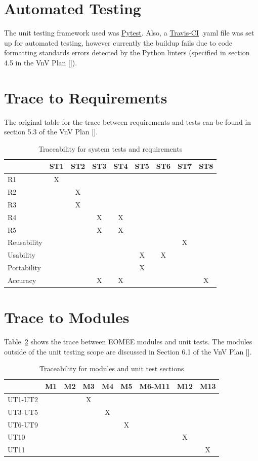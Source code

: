 \documentclass[12pt, titlepage]{article}
\begin{document}
\section{Automated Testing}
The unit testing framework used was \href{https://docs.pytest.org/en/stable/} 
{Pytest}. Also, a \href{https://travis-ci.org/}{Travis-CI} .yaml file was set 
up for automated 
testing, however currently the buildup fails due to code formatting standards 
errors detected by the Python linters (specified in section 4.5 in the VnV 
Plan [\cite{VnV2020}]).

		
\section{Trace to Requirements}
The original table for the trace between requirements and tests can be found in 
section 5.3 of the VnV Plan [\cite{VnV2020}].
\begin{table}[ht]
	\centering
	\begin{tabular}{|l|c|c|c|c|c|c|c|c|}
		\hline
		& ST1& ST2& ST3& ST4& ST5& 
		ST6& ST7& ST8\\	\hline	
		R1& X& & & & & & &\\ \hline
		R2&  & X& & & & & &\\ \hline
		R3&  & X& & & & & &\\ \hline
		R4&  &  & X& X& & & & \\ \hline
		R5&  &  & X& X& & & &\\ \hline
		Reusability& & & & & & &  X& \\ \hline
		Usability& & & & &   X& X& &\\ \hline
		Portability& & & &   & X& && \\ \hline
		Accuracy& & & X& X&  &  & & X\\ \hline
	\end{tabular}
	\caption{Traceability for system tests and requirements}
	\label{table:traceab}
\end{table}
		
\section{Trace to Modules}	

Table~\ref{table:moduletraceab} shows the trace between EOMEE modules and 
unit tests. The modules outside of the unit testing scope are discussed in 
Section 6.1 of the VnV Plan [\cite{VnV2020}].

\begin{table}[ht]
	\centering
	\begin{tabular}{l|c|c|c|c|c|c|c|c}
		\hline
		&M1& M2& M3& M4& M5& M6-M11& M12& M13\\	\hline	
		UT1-UT2&  & & X& & & &&\\ \hline
		UT3-UT5&  & & &X & & &&\\ \hline
		UT6-UT9&  & & & &X & &&\\ \hline
		UT10&  & & & & & &X&\\ \hline
		UT11&  & & & & & &&X\\ \hline
	\end{tabular}
	\caption{Traceability for modules and unit test sections}
	\label{table:moduletraceab}
\end{table}	
\end{document}
